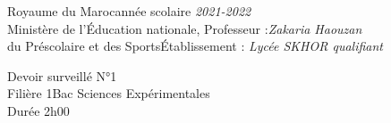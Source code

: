\documentclass[12pt]{article}
\newcommand\headerMe[2]{\noindent{}#1\hfill#2}
\begin{document}
\headerMe{Royaume du Maroc}{année scolaire \emph{2021-2022}}\\
\headerMe{Ministère de l'Éducation nationale, }{  Professeur :\emph{Zakaria Haouzan}}\\
\headerMe{du Préscolaire et des Sports}{Établissement : \emph{Lycée SKHOR qualifiant}}\\

\begin{center}
Devoir surveillé N°1 \\
    Filière 1Bac Sciences Expérimentales\\
Durée 2h00
\\
\end{center}


\end{document}
